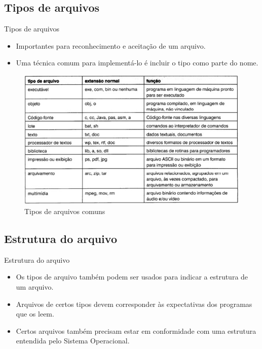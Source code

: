 \documentclass[10pt,brazil]{beamer}
\begin{document}
\subsection{Tipos de arquivos}
\begin{frame}{Tipos de arquivos}
	
	\begin{itemize}
		
	\item Importantes para reconhecimento e aceitação de um arquivo.
	\item Uma técnica comum para implementá-lo é incluir o tipo como parte do nome.
	\end{itemize}   
	
	\begin{figure}[ht!]
		\centering
		\includegraphics[scale=0.37]{tabela1.jpeg}
		\caption{Tipos de arquivos comuns}
		\label{Rotulo}
	\end{figure}
	
\end{frame}

\subsection{Estrutura do arquivo}
\begin{frame}{Estrutura do arquivo}
	\begin{itemize}
	
	\item Os tipos de arquivo também podem ser usados para indicar a estrutura de um arquivo.
	\item Arquivos de certos tipos devem corresponder às expectativas dos programas que os leem.
	\item Certos arquivos também precisam estar em conformidade com uma estrutura entendida pelo Sistema Operacional.
	\end{itemize}
\end{frame}
\end{document}
